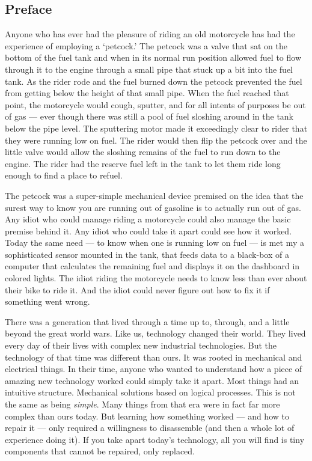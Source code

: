 \documentclass[]{article}
\date{}
\begin{document}
\begin{multicols}{2} %

\hypertarget{preface}{%
\subsection{Preface}\label{preface}}

Anyone who has ever had the pleasure of riding an old motorcycle has had
the experience of employing a `petcock.' The petcock was a valve that
sat on the bottom of the fuel tank and when in its normal run position
allowed fuel to flow through it to the engine through a small pipe that
stuck up a bit into the fuel tank. As the rider rode and the fuel burned
down the petcock prevented the fuel from getting below the height of
that small pipe. When the fuel reached that point, the motorcycle would
cough, sputter, and for all intents of purposes be out of gas --- ever
though there was still a pool of fuel sloshing around in the tank below
the pipe level. The sputtering motor made it exceedingly clear to rider
that they were running low on fuel. The rider would then flip the
petcock over and the little valve would allow the sloshing remains of
the fuel to run down to the engine. The rider had the reserve fuel left
in the tank to let them ride long enough to find a place to refuel.

The petcock was a super-simple mechanical device premised on the idea
that the surest way to know you are running out of gasoline is to
actually run out of gas. Any idiot who could manage riding a motorcycle
could also manage the basic premise behind it. Any idiot who could take
it apart could see how it worked. Today the same need --- to know when
one is running low on fuel --- is met my a sophisticated sensor mounted
in the tank, that feeds data to a black-box of a computer that
calculates the remaining fuel and displays it on the dashboard in
colored lights. The idiot riding the motorcycle needs to know less than
ever about their bike to ride it. And the idiot could never figure out
how to fix it if something went wrong.

There was a generation that lived through a time up to, through, and a
little beyond the great world wars. Like us, technology changed their
world. They lived every day of their lives with complex new industrial
technologies. But the technology of that time was different than ours.
It was rooted in mechanical and electrical things. In their time, anyone
who wanted to understand how a piece of amazing new technology worked
could simply take it apart. Most things had an intuitive structure.
Mechanical solutions based on logical processes. This is not the same as
being \emph{simple}. Many things from that era were in fact far more
complex than ours today. But learning how something worked --- and how
to repair it --- only required a willingness to disassemble (and then a
whole lot of experience doing it). If you take apart today's technology,
all you will find is tiny components that cannot be repaired, only
replaced.


\end{multicols}
\end{document}
